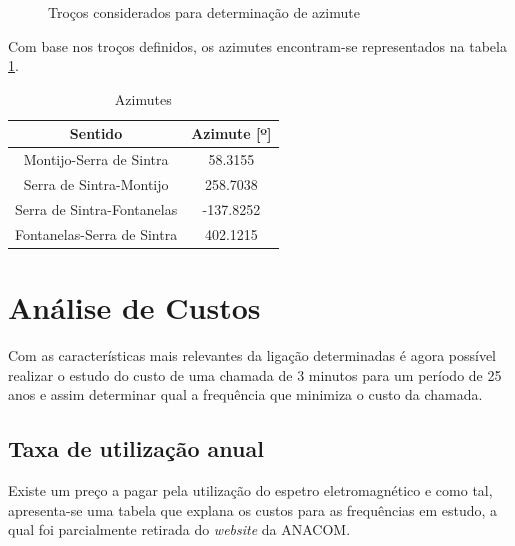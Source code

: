 \begin{figure}[!tbp]
\caption{Troços considerados para determinação de azimute }
\end{figure}
Com base nos troços definidos, os azimutes encontram-se representados na tabela \ref{azimutes}.

\begin{table}[H]
\centering
\begin{tabular}{|c|c|}
\hline
Sentido & Azimute [º]\\
\hline
Montijo-Serra de Sintra & 58.3155\\
Serra de Sintra-Montijo & 258.7038\\
Serra de Sintra-Fontanelas & -137.8252\\
Fontanelas-Serra de Sintra & 402.1215\\
\hline
\end{tabular}
\caption{Azimutes}
\label{azimutes}
\end{table}

\section{Análise de Custos}
Com as características mais relevantes da ligação determinadas é agora possível realizar o estudo do custo de uma chamada de 3 minutos para um período de 25 anos e assim determinar qual a frequência que minimiza o custo da chamada.

\subsection{Taxa de utilização anual}
Existe um preço a pagar pela utilização do espetro eletromagnético e como tal, apresenta-se uma tabela que explana os custos para as frequências em estudo, a qual foi parcialmente retirada do \textit{website} da ANACOM.

